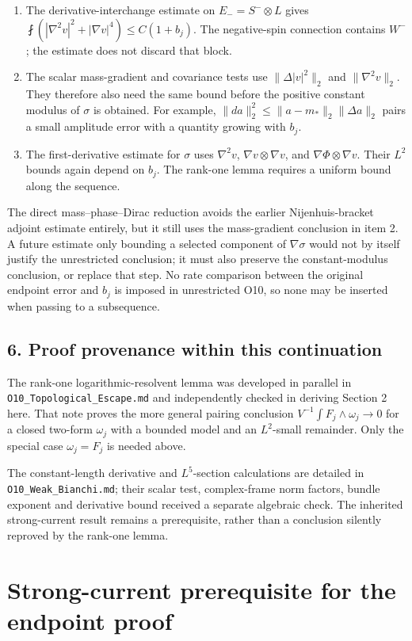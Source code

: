 \documentclass[11pt]{article}
\providecommand{\tightlist}{\setlength{\itemsep}{0pt}\setlength{\parskip}{0pt}}
\begin{document}
\begin{enumerate}
\def\labelenumi{\arabic{enumi}.}
\tightlist
\item
  The derivative-interchange estimate on \(E_-=S^-\otimes L\) gives
  \(\fint(|\nabla^2v|^2+|\nabla v|^4)\le C(1+b_j)\). The negative-spin
  connection contains \(W^-\); the estimate does not discard that block.
\item
  The scalar mass-gradient and covariance tests use
  \(\|\Delta|v|^2\|_2\) and \(\|\nabla^2v\|_2\). They therefore also
  need the same bound before the positive constant modulus of \(\sigma\)
  is obtained. For example, \(\|da\|_2^2\le\|a-m_*\|_2\|\Delta a\|_2\)
  pairs a small amplitude error with a quantity growing with \(b_j\).
\item
  The first-derivative estimate for \(\sigma\) uses \(\nabla^2v\),
  \(\nabla v\otimes\nabla v\), and \(\nabla\Phi\otimes\nabla v\). Their
  \(L^2\) bounds again depend on \(b_j\). The rank-one lemma requires a
  uniform bound along the sequence.
\end{enumerate}

The direct mass--phase--Dirac reduction avoids the earlier
Nijenhuis-bracket adjoint estimate entirely, but it still uses the
mass-gradient conclusion in item 2. A future estimate only bounding a
selected component of \(\nabla\sigma\) would not by itself justify the
unrestricted conclusion; it must also preserve the constant-modulus
conclusion, or replace that step. No rate comparison between the
original endpoint error and \(b_j\) is imposed in unrestricted O10, so
none may be inserted when passing to a subsequence.

\hypertarget{proof-provenance-within-this-continuation}{%
\subsection{6. Proof provenance within this
continuation}\label{proof-provenance-within-this-continuation}}

The rank-one logarithmic-resolvent lemma was developed in parallel in
\texttt{O10\_\allowbreak{}Topological\_\allowbreak{}Escape.md} and independently checked in
deriving Section 2 here. That note proves the more general pairing
conclusion \(V^{-1}\int F_j\wedge\omega_j\to0\) for a closed two-form
\(\omega_j\) with a bounded model and an \(L^2\)-small remainder. Only
the special case \(\omega_j=F_j\) is needed above.

The constant-length derivative and \(L^5\)-section calculations are
detailed in \texttt{O10\_\allowbreak{}Weak\_\allowbreak{}Bianchi.md}; their scalar test,
complex-frame norm factors, bundle exponent and derivative bound
received a separate algebraic check. The inherited strong-current result
remains a prerequisite, rather than a conclusion silently reproved by
the rank-one lemma.
\clearpage
\appendix
\hypertarget{strong-current-prerequisite-for-the-endpoint-proof}{%
\section{Strong-current prerequisite for the endpoint
proof}\label{strong-current-prerequisite-for-the-endpoint-proof}}
\end{document}
